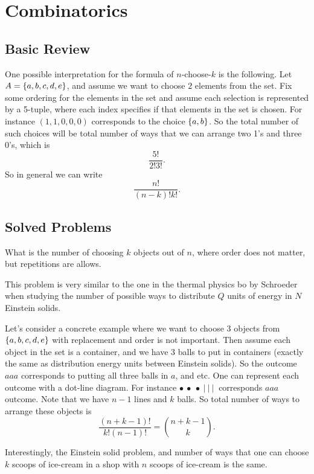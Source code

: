 \chapter{Combinatorics}


\section{Basic Review}

\begin{summary}
	One possible interpretation for the formula of $ n $-choose-$ k $ is the following. Let $ A = \{a,b,c,d,e\} $, and assume we want to choose $ 2 $ elements from the set. Fix some ordering for the elements in the set and assume each selection is represented by a 5-tuple, where each index specifies if that elements in the set is chosen. For instance $ (1,1,0,0,0) $ corresponds to the choice $ \{a,b\} $. So the total number of such choices will be total number of ways that we can arrange two 1's and three 0's, which is
	\[ \frac{5!}{2! 3!}. \]
	So in general we can write
	\[ \frac{n!}{(n-k)! k!}. \]
\end{summary}




\section{Solved Problems}
\begin{problem}
	What is the number of choosing $ k $ objects out of $ n $, where order does not matter, but repetitions are allows.
\end{problem}
\begin{solution}
	This problem is very similar to the one in the thermal physics bo by Schroeder when studying the number of possible ways to distribute $ Q $ units of energy in $ N $ Einstein solids. 
	
	Let's consider a concrete example where we want to choose 3 objects from $ \{a,b,c,d,e\} $ with replacement and order is not important. Then assume each object in the set is a container, and we have 3 balls to put in containers (exactly the same as distribution energy units between Einstein solids). So the outcome $ aaa $ corresponds to putting all three balls in $ a $, and etc. One can represent each outcome with a dot-line diagram. For instance $\bullet\ \bullet\ \bullet\ |\ |\ |\ $ corresponds $ aaa $ outcome. Note that we have $ n-1 $ lines and $ k $ balls. So total number of ways to arrange these objects is
	\[ \frac{(n+k-1)!}{k!(n-1)!} = \binom{n+k-1}{k}. \]
\end{solution} 
\begin{remark}
	Interestingly, the Einstein solid problem, and number of ways that one can choose $ k $ scoops of ice-cream in a shop with $ n $ scoops of ice-cream is the same.
\end{remark}